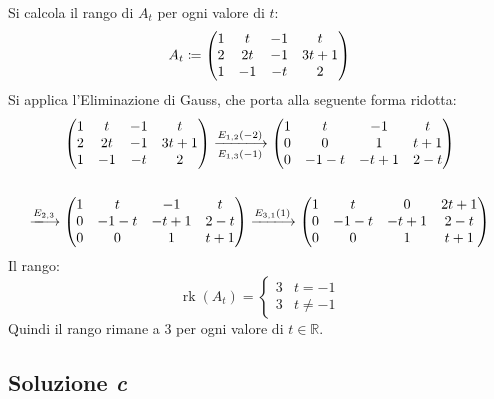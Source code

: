 \documentclass[a4paper]{article}
\makeatletter
\DeclareMathOperator{\rk}{rk}
\newenvironment{rowequmat}[1]{\left(\array{@{}#1@{}}}{\endarray\right)}
\makeatother
\begin{document}
	Si calcola il rango di $A_{t}$ per ogni valore di $t$:
	\begin{equation*}
		A_{t} \coloneq \begin{rowequmat}{cccc}
			1 & t & -1 & t \\
			2 & 2t & -1 & 3t+1 \\
			1 & -1 & -t & 2
		\end{rowequmat}
	\end{equation*}
	Si applica l'Eliminazione di Gauss, che porta alla seguente forma ridotta:
	\begin{gather*}
		\begin{rowequmat}{cccc}
			1 & t & -1 & t \\
			2 & 2t & -1 & 3t+1 \\
			1 & -1 & -t & 2
		\end{rowequmat} \xlongrightarrow[E_{1,3}\left(-1\right)]{E_{1,2}\left(-2\right)}
		\begin{rowequmat}{cccc}
			1 & t & -1 & t \\
			0 & 0 &  1 & t+1 \\
			0 & -1-t & -t+1 & 2-t
		\end{rowequmat} \\
		\\
		\xlongrightarrow{E_{2,3}}
		\begin{rowequmat}{cccc}
			1 & t & -1 & t \\
			0 & -1-t & -t+1 & 2-t \\
			0 & 0 &  1 & t+1
		\end{rowequmat} \xlongrightarrow{E_{3,1}\left(1\right)}
		\begin{rowequmat}{cccc}
			1 & t & 0 & 2t+1 \\
			0 & -1-t & -t+1 & 2-t \\
			0 & 0 &  1 & t+1
		\end{rowequmat}
	\end{gather*}
	Il rango:
	\begin{equation*}
		\rk\left(A_{t}\right) = \begin{cases}
			3 & t = -1 \\
			3 & t \ne -1
		\end{cases}
	\end{equation*}
	Quindi il rango rimane a $3$ per ogni valore di $t \in \mathbb{R}$.\newpage
	
	\subsection{Soluzione \emph{c}}
	
\end{document}

